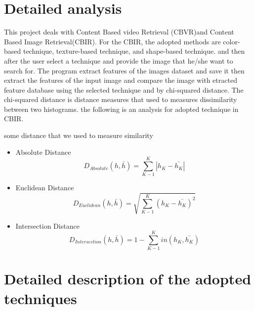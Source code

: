 \documentclass[pdftex,10pt,a4paper,oneside]{article}
\begin{document}
	
	\pagebreak
	\section{Detailed analysis}
	This project deals with Content Based video Retrieval (CBVR)and Content Based Image Retrieval(CBIR). 
	For the CBIR, the adopted methods are color-based technique, texture-based technique, and shape-based technique. and then after the user select a technique and provide the image that he/she want to search for. The program extract features of the images dataset and save it then extract the features of the input image and compare the image with etracted feature database using the selected technique and by chi-squared distance. The chi-squared distance is distance measures that used to measures dissimilarity between two histograms. the following is an analysis for adopted technique in CBIR.

some distance that we used to measure similarity 
\begin{itemize}
	\item Absolute Distance \\
	\begin{equation}
		D_{Absolute}(h,\bar{h})= \sum_{K-1}^{K} |h_{K}-\bar{h_{K}}|
	\end{equation}
	\item Euclidean Distance \\
	\begin{equation}
		D_{Euclidean}(h,\bar{h})= \sqrt{\sum_{K-1}^{K} (h_{K}-\bar{h_{K}})^{2}}
	\end{equation}
	\item Intersection Distance \\
	\begin{equation}
	D_{Intersection}(h,\bar{h})= 1- \sum_{K-1}^{K} in(h_{K},\bar{h_{K}})
	\end{equation}
	
	
	
\end{itemize}


	
	\pagebreak
	\section{Detailed description of the adopted techniques }
\end{document}
